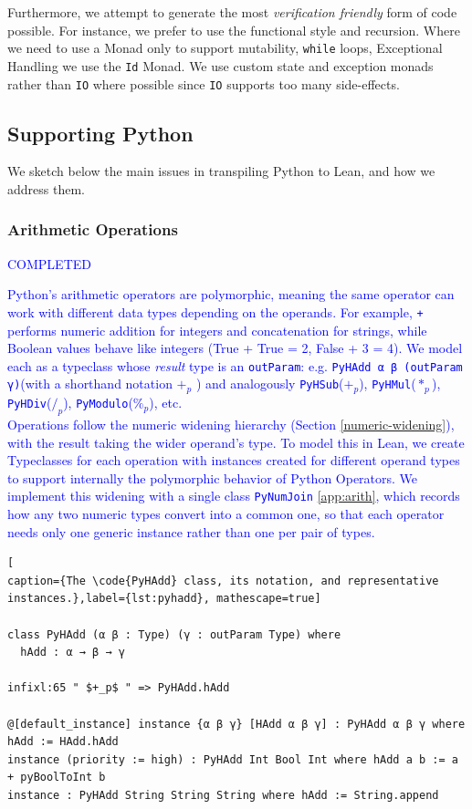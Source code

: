 \documentclass{article}
\newcommand{\code}{\lstinline}
\newcommand{\suggest}[1]{\textcolor{blue}{#1}}
\begin{document}
Furthermore, we attempt to generate the most \emph{verification friendly} form of code possible. For instance, we prefer to use the functional style and recursion. Where we need to use a Monad only to support mutability, \code{while} loops, Exceptional Handling we use the \code{Id} Monad. We use custom state and exception monads rather than \code{IO} where possible since \code{IO} supports too many side-effects.

\subsection{Supporting Python}

We sketch below the main issues in transpiling Python to Lean, and how we address them.

\subsubsection{Arithmetic Operations}\label{sec:arith}

\suggest{COMPLETED}

\suggest{
Python's arithmetic operators are polymorphic, meaning the same operator can work with different data types depending on the operands. For example, \code{+} performs numeric addition for integers and concatenation for strings, while Boolean values behave like integers (True + True = 2, False + 3 = 4). We model each as a typeclass whose \emph{result} type is an \code{outParam}: e.g. \code{PyHAdd α β (outParam γ)}(with a shorthand notation $+_p$ ) and analogously \code{PyHSub}($+_p$), \code{PyHMul}($*_p$), \code{PyHDiv}($/_p$), \code{PyModulo}($\%_p$), etc. \\
Operations follow the numeric widening hierarchy (Section \ref{numeric-widening}), with the result taking the wider operand's type. To model this in Lean, we create Typeclasses for each operation with instances created for different operand types to support internally the polymorphic behavior of Python Operators. We implement this widening with a single class \code{PyNumJoin} \ref{app:arith}, which records how any two numeric types convert into a common one, so that each operator needs only one generic instance rather than one per pair of types.}

\begin{lstlisting}[
caption={The \code{PyHAdd} class, its notation, and representative instances.},label={lst:pyhadd}, mathescape=true]

class PyHAdd (α β : Type) (γ : outParam Type) where
  hAdd : α → β → γ

infixl:65 " $+_p$ " => PyHAdd.hAdd

@[default_instance] instance {α β γ} [HAdd α β γ] : PyHAdd α β γ where hAdd := HAdd.hAdd
instance (priority := high) : PyHAdd Int Bool Int where hAdd a b := a + pyBoolToInt b
instance : PyHAdd String String String where hAdd := String.append
\end{lstlisting}
\end{document}
